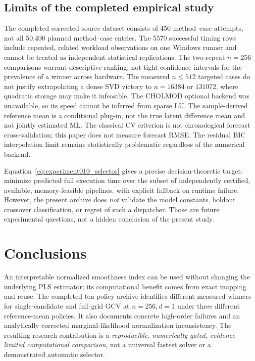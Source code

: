 \subsection{Limits of the completed empirical study}
The completed corrected-source dataset consists of
450 method--case attempts, not all 50,400 planned
method--case entries. The 5570 successful timing rows
include repeated, related workload observations on
one Windows runner and cannot be treated as
independent statistical replications. The two-repeat
$n=256$ comparisons warrant descriptive ranking,
not tight confidence intervals for the prevalence of
a winner across hardware. The measured $n\leq512$
targeted cases do not justify extrapolating a dense
SVD victory to $n=16384$ or $131072$, where
quadratic storage may make it infeasible.
The CHOLMOD optional backend was unavailable, so
its speed cannot be inferred from sparse LU.
The sample-derived reference mean is a conditional
plug-in, not the true latent difference mean and
not jointly estimated ML. The classical CV criterion
is not chronological forecast cross-validation;
this paper does not measure forecast RMSE. The
residual BIC interpolation limit remains statistically
problematic regardless of the numerical backend.

Equation~\eqref{eq:experiment010_selector} gives a
precise decision-theoretic target: minimize predicted
full execution time over the subset of independently
certified, available, memory-feasible pipelines,
with explicit fallback on runtime failure.
However, the present archive does \emph{not}
validate the model constants, holdout crossover
classification, or regret of such a dispatcher.
Those are future experimental questions, not a
hidden conclusion of the present study.

\section{Conclusions}
An interpretable normalized smoothness index can be
used without changing the underlying PLS estimator;
its computational benefit comes from exact mapping
and reuse. The completed ten-policy archive identifies
different measured winners for single-candidate and
full-grid GCV at $n=256,d=1$ under three different
reference-mean policies. It also documents concrete
high-order failures and an analytically corrected
marginal-likelihood normalization inconsistency.
The resulting research contribution is a
\emph{reproducible, numerically gated, evidence-limited
computational comparison}, not a universal fastest
solver or a demonstrated automatic selector.

